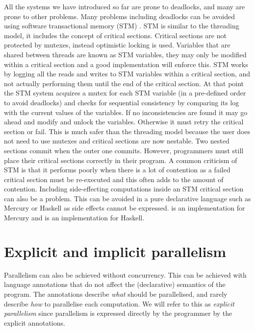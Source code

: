 All the systems we have introduced so far are prone to deadlocks,
and many are prone to other problems.
Many problems including deadlocks can be avoided using software
transactional memory (STM) \citep{stm}.
STM is similar to the threading model, it includes the concept of critical
sections.
Critical sections are not protected by mutexes,
instead optimistic locking is used.
Variables that are shared between threads are known as STM variables,
they may only be modified within a critical section and a good implementation
will enforce this.
STM works by logging all the reads and writes to STM variables within a
critical section, and not actually performing them until the end of the
critical section.
At that point the STM system acquires a mutex for each STM variable
(in a pre-defined order to avoid deadlocks)
and checks for sequential consistency by comparing its log with the current
values of the variables.
If no inconsistencies are found
it may go ahead and modify and unlock the variables.
Otherwise it must retry the critical section or fail.
This is much safer than the threading model because
the user does not need to use mutexes and critical sections are now
nestable.
Two nested sections commit when the outer one commits.
However, programmers must still place their critical sections correctly in
their program.
A common criticism of STM is that it performs poorly when there is a lot of
contention as a failed critical section must be re-executed and this often
adds to the amount of contention.
Including side-effecting computations inside an STM critical section can also
be a problem.
This can be avoided in a pure declarative language such as
Mercury \citep{mercury_jlp} or Haskell \citep{haskell98} as side effects cannot
be expressed.
\citet*{mika:mercury-stm} is an implementation for Mercury
and \citet*{harris:2005:haskell-stm} is an implementation for Haskell.

\section{Explicit and implicit parallelism}
\label{sec:intro_par}

Parallelism can also be achieved without concurrency.
This can be achieved with language annotations that do not affect the
(declarative) semantics of the program.
The annotations describe \emph{what} should be parallelised,
and rarely describe \emph{how} to parallelise each computation.
We will refer to this as \emph{explicit parallelism}
since parallelism is expressed directly by the programmer by the explicit
annotations.

